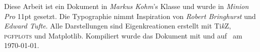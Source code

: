 {{{{        Diese Arbeit ist ein  Dokument in \textit{Markus Kohm}'s  Klasse und wurde in \textit{Minion Pro} 11pt gesetzt.
        Die Typographie nimmt Inspiration von \textit{Robert Bringhurst} und \textit{Edward Tufte}.
        Alle Darstellungen sind Eigenkreationen erstellt mit Ti\textit{k}Z, \textsc{pgfplots} und \textsf{Matplotlib}.
        Kompiliert wurde das Dokument mit  und  auf \platformname\ am \today.

    \begin{center}
        \HighlightColor{\textsc{
            \authorFirst\;\authorLast
        }}\\
        \makeatletter
        \makeatother
    \end{center}


}}\hfill}

}
